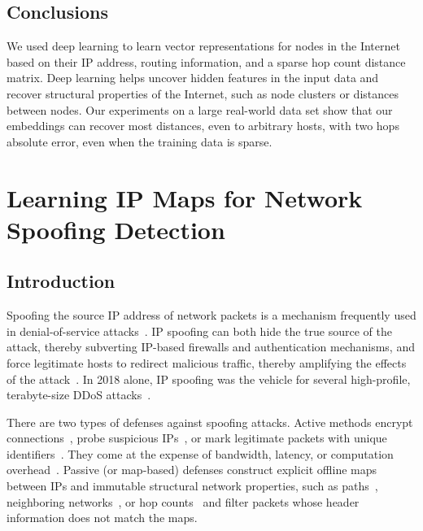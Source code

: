 \subsection{Conclusions}
\label{dip:conclusions}

We used deep learning to learn vector representations for nodes in the Internet based on their IP address, routing information, and a sparse hop count distance matrix. Deep learning helps uncover hidden features in the input data and recover structural properties of the Internet, such as node clusters or distances between nodes. Our experiments on a large real-world data set show that our embeddings can recover most distances, even to arbitrary hosts, with two hops absolute error, even when the training data is sparse. 



\section{Learning IP Maps for Network Spoofing Detection}
\subsection{Introduction}
\label{spoof:intro}

Spoofing the source IP address of network packets is a mechanism frequently used in denial-of-service attacks~\citep{spoofing-ddos,spoofing-ps}. IP spoofing can both hide the true source of the attack, thereby subverting IP-based firewalls and authentication mechanisms, and force legitimate hosts to redirect malicious traffic, thereby amplifying the effects of the attack~\citep{github-spoofing}. In 2018 alone, IP spoofing was the vehicle for several high-profile, terabyte-size DDoS attacks~\citep{cloudflare,github-spoofing,arbor-spoofing}.  

There are two types of defenses against spoofing attacks. Active methods encrypt connections~\citep{ipsec}, probe suspicious IPs~\citep{puzzles}, or mark legitimate packets with unique identifiers~\citep{spm,spi}. They come at the expense of bandwidth, latency, or computation overhead~\citep{ipsec-overhead}.
%
Passive (or map-based) defenses construct explicit offline maps between IPs and immutable structural network properties, such as paths~\citep{rbf,idpf}, neighboring networks~\citep{ingress,egress,rpf}, or hop counts~\citep{iphc} and filter packets whose header information does not match the maps.


